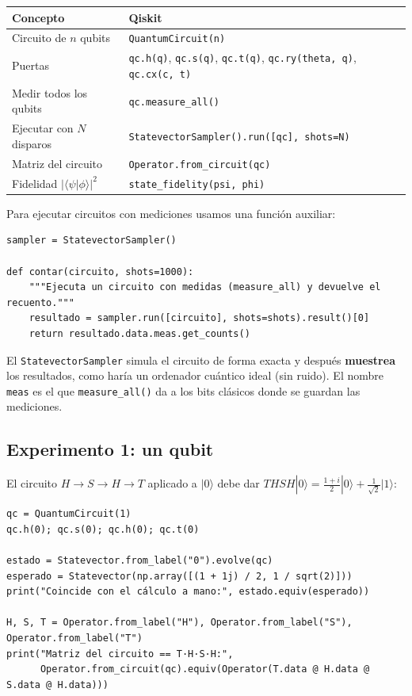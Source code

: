\documentclass[11pt, a4paper, twoside, openright]{report}
\begin{document}
\begin{center}
\small
\begin{tabular}{l|l}
\textbf{Concepto} & \textbf{Qiskit} \\ \hline
Circuito de $n$ qubits & \texttt{QuantumCircuit(n)} \\
Puertas & \texttt{qc.h(q)}, \texttt{qc.s(q)}, \texttt{qc.t(q)}, \texttt{qc.ry(theta, q)}, \texttt{qc.cx(c, t)} \\
Medir todos los qubits & \texttt{qc.measure\_all()} \\
Ejecutar con $N$ disparos & \texttt{StatevectorSampler().run([qc], shots=N)} \\
Matriz del circuito & \texttt{Operator.from\_circuit(qc)} \\
Fidelidad $|\langle\psi|\phi\rangle|^2$ & \texttt{state\_fidelity(psi, phi)}
\end{tabular}
\end{center}

\noindent Para ejecutar circuitos con mediciones usamos una función auxiliar:
\begin{lstlisting}
sampler = StatevectorSampler()

def contar(circuito, shots=1000):
    """Ejecuta un circuito con medidas (measure_all) y devuelve el recuento."""
    resultado = sampler.run([circuito], shots=shots).result()[0]
    return resultado.data.meas.get_counts()
\end{lstlisting}
\noindent El \texttt{StatevectorSampler} simula el circuito de forma exacta y después \textbf{muestrea} los resultados, como haría un ordenador cuántico ideal (sin ruido). El nombre \texttt{meas} es el que \texttt{measure\_all()} da a los bits clásicos donde se guardan las mediciones.

\subsection{Experimento 1: un qubit}

\noindent El circuito $H\to S\to H\to T$ aplicado a $|0\rangle$ debe dar $THSH|0\rangle = \frac{1+i}{2}|0\rangle + \frac{1}{\sqrt2}|1\rangle$:
\begin{lstlisting}
qc = QuantumCircuit(1)
qc.h(0); qc.s(0); qc.h(0); qc.t(0)

estado = Statevector.from_label("0").evolve(qc)
esperado = Statevector(np.array([(1 + 1j) / 2, 1 / sqrt(2)]))
print("Coincide con el cálculo a mano:", estado.equiv(esperado))

H, S, T = Operator.from_label("H"), Operator.from_label("S"), Operator.from_label("T")
print("Matriz del circuito == T·H·S·H:",
      Operator.from_circuit(qc).equiv(Operator(T.data @ H.data @ S.data @ H.data)))
\end{lstlisting}
\end{document}

